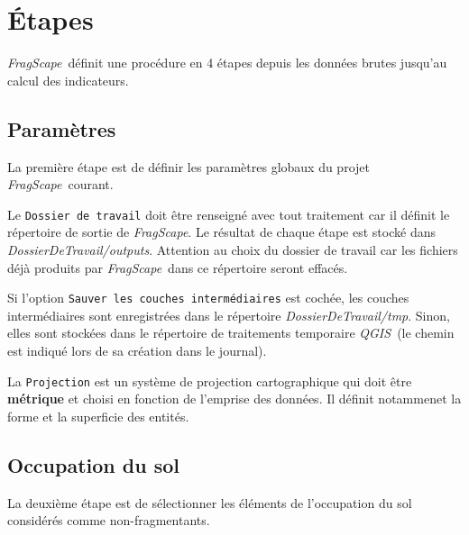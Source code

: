 \documentclass[11pt]{article}
\newcommand{\tool}{\emph{FragScape}}
\newcommand{\qgis}{\emph{QGIS}}
\begin{document}
\section{Étapes}

\tool\ définit une procédure en 4 étapes depuis les données brutes jusqu'au calcul des indicateurs.

\subsection{Paramètres}

La première étape est de définir les paramètres globaux du projet \tool\ courant.

Le \texttt{Dossier de travail} doit être renseigné avec tout traitement car il définit le répertoire de sortie de \tool. Le résultat de chaque étape est stocké dans \textit{DossierDeTravail/outputs}. Attention au choix du dossier de travail car les fichiers déjà produits par \tool\ dans ce répertoire seront effacés.

Si l'option \texttt{Sauver les couches intermédiaires} est cochée, les couches intermédiaires sont enregistrées dans le répertoire \textit{DossierDeTravail/tmp}. Sinon, elles sont stockées dans le répertoire de traitements temporaire \qgis\ (le chemin est indiqué lors de sa création dans le journal).

La \texttt{Projection} est un système de projection cartographique qui doit être \textbf{métrique} et choisi en fonction de l'emprise des données. Il définit notammenet la forme et la superficie des entités.

\pagebreak

\subsection{Occupation du sol}

La deuxième étape est de sélectionner les éléments de l'occupation du sol considérés comme non-fragmentants.
\end{document}
